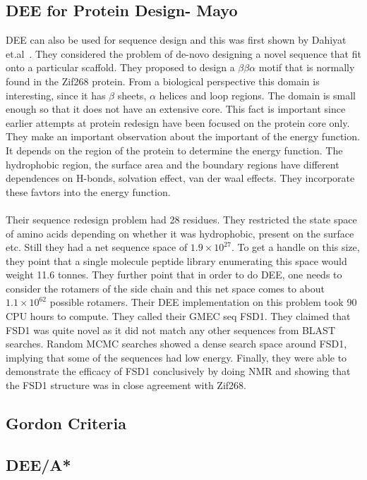\documentclass{article}
\begin{document}
\subsection{DEE for Protein Design- Mayo}
DEE can also be used for sequence design and this was first shown by Dahiyat et.al~\cite{Dahiyat1997}. They considered the problem of de-novo designing a novel sequence that fit onto a particular scaffold. They proposed to design a $\beta\beta\alpha$ motif that is normally found in the Zif268 protein. 
From a biological perspective this domain is interesting, since it has $\beta$ sheets, $\alpha$ helices and loop regions. The domain is small enough so that it does not have an extensive core. 
This fact is important since earlier attempts at protein redesign have been focused on the protein core only. 
They make an important observation about the important of the energy function. It depends on the region of the protein to determine the energy function. The hydrophobic region, the surface area and the boundary regions have different dependences on H-bonds, solvation effect, van der waal effects. 
They incorporate these favtors into the energy function. 
\\
\\
Their sequence redesign problem had 28 residues. They restricted the state space of amino acids depending on whether it was hydrophobic, present on the surface etc. Still they had a net sequence space of $1.9 \times 10^{27}$. To get a handle on this size, they point that a single molecule peptide library enumerating this space would weight 11.6 tonnes. They further point that in order to do DEE, one needs to consider the rotamers of the side chain and this net space comes to about $1.1 \times 10^{62}$ possible rotamers. 
Their DEE implementation on this problem took 90 CPU hours to compute. They called their GMEC seq FSD1. They claimed that FSD1 was quite novel as it did not match any other sequences from BLAST searches. Random MCMC searches showed a dense search space around FSD1, implying that some of the sequences had low energy. 
Finally, they were able to demonstrate the efficacy of FSD1 conclusively by doing NMR and showing that the FSD1 structure was in close agreement with Zif268.

\subsection{Gordon Criteria}



\subsection{DEE/A*}
\end{document}
